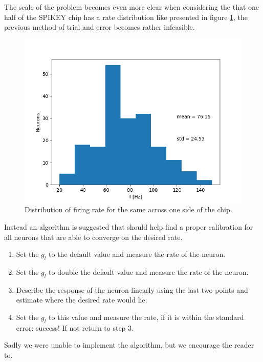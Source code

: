 \documentclass[a4paper,twocolumn]{article}
\begin{document}
The scale of the problem becomes even more clear when considering the that one
half of the SPIKEY chip has a rate distribution like presented in figure
\ref{fig:distribution}, the previous method of trial and error becomes rather
infeasible.

\begin{figure}[ht]
    \centering
    \includegraphics[width=.5\textwidth]{figures/rate-distribution.png}
    \caption{Distribution of firing rate for the same across one side of the
    chip.}
    \label{fig:distribution}
\end{figure}

Instead an algorithm is suggested that should help find a proper calibration for
all neurons that are able to converge on the desired rate.
\begin{enumerate}
    \item Set the $g_l$ to the default value and measure the rate of the neuron.
    \item Set the $g_l$ to double the default value and measure the rate of the
        neuron.
    \item Describe the response of the neuron linearly using the last two
        points and estimate where the desired rate would lie.
    \item Set the $g_l$ to this value and measure the rate, if it is within the
        standard error: success! If not return to step 3.
\end{enumerate}
Sadly we were unable to implement the algorithm, but we encourage the reader
to.
\end{document}
